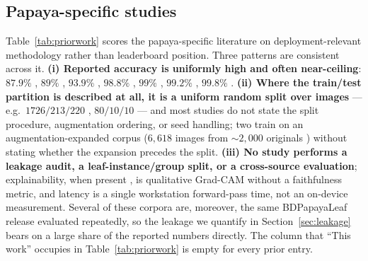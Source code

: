 \documentclass[10pt,twocolumn,a4paper]{article}
\begin{document}
\subsection{Papaya-specific studies}
\label{sec:papaya-related}
Table~\ref{tab:priorwork} scores the papaya-specific literature on deployment-relevant methodology rather than leaderboard position. Three patterns are consistent across it. \textbf{(i) Reported accuracy is uniformly high and often near-ceiling}: $87.9\%$ \cite{chaithanya2023}, $89\%$ \cite{rana2026}, $93.9\%$ \cite{srivathsan2026}, $98.8\%$ \cite{gani2025}, $99\%$ \cite{danuarta2026}, $99.2\%$ \cite{salaheldin2026}, $99.8\%$ \cite{banarase2024}. \textbf{(ii) Where the train/test partition is described at all, it is a uniform random split over images} --- e.g.\ $1726/213/220$ \cite{chaithanya2023}, $80/10/10$ \cite{rana2026} --- and most studies do not state the split procedure, augmentation ordering, or seed handling; two train on an augmentation-expanded corpus ($6{,}618$ images from $\sim2{,}000$ originals \cite{salaheldin2026, gani2025}) without stating whether the expansion precedes the split. \textbf{(iii) No study performs a leakage audit, a leaf-instance/group split, or a cross-source evaluation}; explainability, when present \cite{srivathsan2026, gani2025}, is qualitative Grad-CAM without a faithfulness metric, and latency is a single workstation forward-pass time, not an on-device measurement. Several of these corpora are, moreover, the same BDPapayaLeaf release \cite{bdpapaya2024} evaluated repeatedly, so the leakage we quantify in Section~\ref{sec:leakage} bears on a large share of the reported numbers directly. The column that ``This work'' occupies in Table~\ref{tab:priorwork} is empty for every prior entry.
\end{document}
